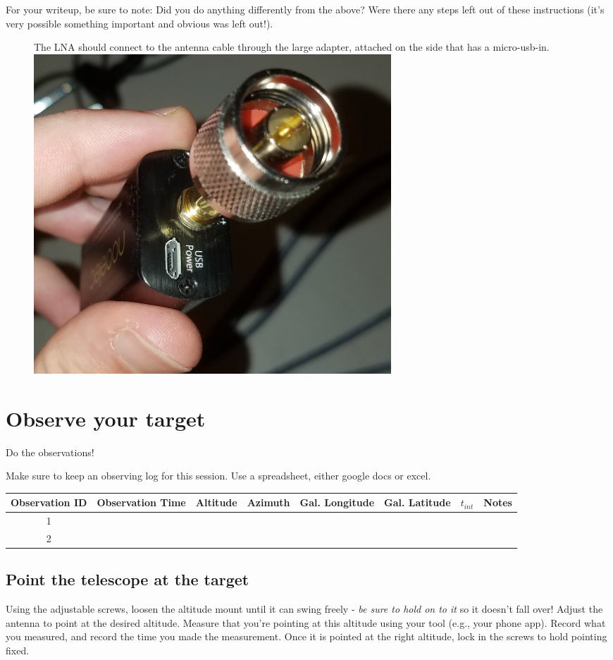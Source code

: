 \documentclass[11pt]{article}
\begin{document}
For your writeup, be sure to note: Did you do anything differently from the above?
Were there any steps left out of these instructions (it's very possible something important
and obvious was left out!).


\begin{figure}[htp]
    \begin{minipage}{0.45\textwidth}
    \centering
        The LNA should connect to the antenna cable through the large adapter, attached on the side that has a micro-usb-in.\\
        \vspace{3mm}
    \includegraphics[width=0.65\textwidth]{RadioLabPhotos/coax_adapter_on_LNA.jpg}
    \end{minipage}
\end{figure}

\clearpage
\section{Observe your target}
\label{sec:observe}

\par Do the observations!

Make sure to keep an observing log for this session.  Use a spreadsheet, either google docs or excel.

\begin{tabular}{|c|c|c|c|c|c|c|c|}
\hline
Observation ID & Observation Time & Altitude & Azimuth &  Gal. Longitude & Gal. Latitude  & $t_{int}$ & Notes \\
\hline
 1  & & & & & & & \\
 \hline
 2  & & & & & & & \\
 \hline
\end{tabular}

\subsection{Point the telescope at the target}
\label{sec:point}
Using the adjustable screws, loosen the altitude mount until it can swing freely - \emph{be sure to hold on to it} so it doesn't fall over!
Adjust the antenna to point at the desired altitude.
Measure that you're pointing at this altitude using your tool (e.g., your phone app).
Record what you measured, and record the time you made the measurement.
Once it is pointed at the right altitude, lock in the screws to hold pointing fixed.
\end{document}
